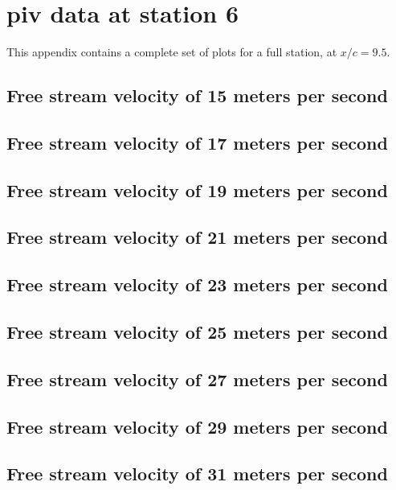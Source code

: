 

\chapter{piv data at station 6}
\label{appendix:station_6}

This appendix contains a complete set of plots for a full station, at $x/c=9.5$.


\section{Free stream velocity of 15 meters per second}

\newpage
\section{Free stream velocity of 17 meters per second}

\newpage
\section{Free stream velocity of 19 meters per second}

\newpage
\section{Free stream velocity of 21 meters per second}

\newpage
\section{Free stream velocity of 23 meters per second}

\newpage
\section{Free stream velocity of 25 meters per second}

\newpage
\section{Free stream velocity of 27 meters per second}

\newpage
\section{Free stream velocity of 29 meters per second}

\newpage
\section{Free stream velocity of 31 meters per second}

\newpage
